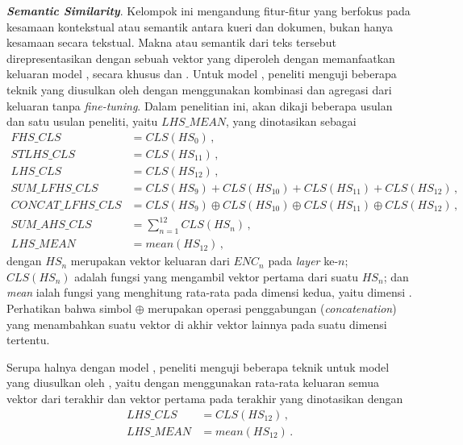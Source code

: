 \vspace{2mm}
\noindent{}\textbf{\textit{Semantic Similarity}}. Kelompok ini mengandung fitur-fitur yang berfokus pada kesamaan kontekstual atau semantik antara kueri dan dokumen, bukan hanya kesamaan secara tekstual. Makna atau semantik dari teks tersebut direpresentasikan dengan sebuah vektor yang diperoleh dengan memanfaatkan keluaran model \neural{} \network{}, secara khusus \tfive{} dan \bert{}. Untuk model \bert{}, peneliti menguji beberapa teknik yang diusulkan oleh \citet{devlin2018bert} dengan menggunakan kombinasi dan agregasi dari keluaran  \bert{} tanpa \textit{fine-tuning}. Dalam penelitian ini, akan dikaji beberapa usulan \citet{devlin2018bert} dan satu usulan peneliti, yaitu  $LHS\_MEAN$, yang dinotasikan sebagai
\begin{align*}
    FHS\_CLS&=CLS(HS_{0}) \, , \\
    STLHS\_CLS&=CLS(HS_{11}) \, , \\
    LHS\_CLS&=CLS(HS_{12}) \, , \\
    SUM\_LFHS\_CLS&=CLS(HS_{9}) + CLS(HS_{10}) + CLS(HS_{11}) + CLS(HS_{12}) \, , \\
    CONCAT\_LFHS\_CLS&=CLS(HS_{9}) \oplus{} CLS(HS_{10}) \oplus{} CLS(HS_{11}) \oplus{} CLS(HS_{12}) \, , \\
    SUM\_AHS\_CLS&=\sum^{12}_{n=1} CLS(HS_{n}) \, , \\
    LHS\_MEAN&=mean(HS_{12}) \, ,
\end{align*}
dengan $HS_{n}$ merupakan vektor keluaran dari $ENC_{n}$ pada \textit{layer} ke-$n$; $CLS(HS_{n})$ adalah fungsi yang mengambil vektor \token{} pertama dari suatu \hs{} $HS_{n}$; dan \textit{mean} ialah fungsi yang menghitung rata-rata pada dimensi kedua, yaitu dimensi \token{}. Perhatikan bahwa simbol $\oplus{}$ merupakan operasi penggabungan (\textit{concatenation}) yang menambahkan suatu vektor di akhir vektor lainnya pada suatu dimensi tertentu.

Serupa halnya dengan model \bert{}, peneliti menguji beberapa teknik untuk model \tfive{} yang diusulkan oleh \citet{ni2021sentence}, yaitu dengan menggunakan rata-rata keluaran semua vektor \token{} dari \hs{} terakhir dan vektor \token{} pertama pada \hs{} terakhir yang dinotasikan dengan
\begin{align*}
    LHS\_CLS&=CLS(HS_{12}) \, ,\\
    LHS\_MEAN&=mean(HS_{12}) \, .
\end{align*}

